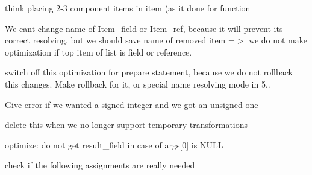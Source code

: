 \begin{DoxyRefList}
\item[\label{todo__todo000033}%
\Hypertarget{todo__todo000033}%
Member \mbox{\hyperlink{classItem__row_a8f0ccfbe35ebded8e8a9b3ba13ff9db3}{Item\+\_\+row\+:\+:Item\+\_\+row}} (const P\+OS \&pos, \mbox{\hyperlink{classItem}{Item}} $\ast$head, \mbox{\hyperlink{classList}{List$<$ Item $>$}} \&tail)]think placing 2-\/3 component items in item (as it done for function  
\item[\label{todo__todo000036}%
\Hypertarget{todo__todo000036}%
Member \mbox{\hyperlink{classItem__singlerow__subselect_ad94e0b9d5a9d2d386405ef76c2bd0c69}{Item\+\_\+singlerow\+\_\+subselect\+:\+:select\+\_\+transformer}} (st\+\_\+select\+\_\+lex $\ast$select)]
\begin{DoxyItemize}
\item We cant change name of \mbox{\hyperlink{classItem__field}{Item\+\_\+field}} or \mbox{\hyperlink{classItem__ref}{Item\+\_\+ref}}, because it will prevent it\textquotesingle{}s correct resolving, but we should save name of removed item =$>$ we do not make optimization if top item of list is field or reference.
\item switch off this optimization for prepare statement, because we do not rollback this changes. Make rollback for it, or special name resolving mode in 5..  
\end{DoxyItemize}
\item[\label{todo__todo000027}%
\Hypertarget{todo__todo000027}%
Member \mbox{\hyperlink{classItem__string_a4226f4dfd6a0c9eb1b97c33da0b3db78}{Item\+\_\+string\+:\+:val\+\_\+int}} ()]Give error if we wanted a signed integer and we got an unsigned one  
\item[\label{todo__todo000040}%
\Hypertarget{todo__todo000040}%
Member \mbox{\hyperlink{classItem__sum_ae446ff1dc1d0a43af8a3b57861512d58}{Item\+\_\+sum\+:\+:get\+\_\+arg\+\_\+ptr}} (uint i)]delete this when we no longer support temporary transformations  
\item[\label{todo__todo000039}%
\Hypertarget{todo__todo000039}%
Member \mbox{\hyperlink{classItem__sum__hybrid_ad7d563ebdca9c58beec529763623c3fb}{Item\+\_\+sum\+\_\+hybrid\+:\+:min\+\_\+max\+\_\+update\+\_\+decimal\+\_\+field}} ()]optimize\+: do not get result\+\_\+field in case of args\mbox{[}0\mbox{]} is N\+U\+LL  
\item[\label{todo__todo000038}%
\Hypertarget{todo__todo000038}%
Member \mbox{\hyperlink{classItem__sum__sum_af259b3fb68c269dba5d29d7f1e2323eb}{Item\+\_\+sum\+\_\+sum\+:\+:Item\+\_\+sum\+\_\+sum}} (T\+HD $\ast$thd, \mbox{\hyperlink{classItem__sum__sum}{Item\+\_\+sum\+\_\+sum}} $\ast$item)]check if the following assignments are really needed  

\end{DoxyRefList}
